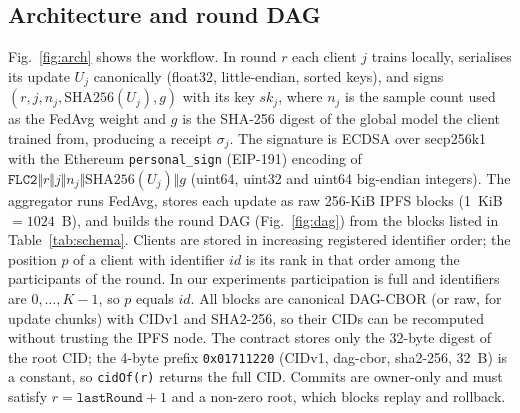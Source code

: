 \documentclass[final,3p,times,twocolumn]{elsarticle}
\begin{document}
\subsection{Architecture and round DAG}
Fig.~\ref{fig:arch} shows the workflow. In round $r$ each client $j$ trains locally, serialises its update $U_j$ canonically (float32, little-endian, sorted keys), and signs $(r, j, n_j, \mathrm{SHA256}(U_j), g)$ with its key $sk_j$, where $n_j$ is the sample count used as the FedAvg weight and $g$ is the SHA-256 digest of the global model the client trained from, producing a receipt $\sigma_j$. The signature is ECDSA over secp256k1 with the Ethereum \texttt{personal\_sign} (EIP-191) encoding of $\texttt{FLC2}\Vert r\Vert j\Vert n_j\Vert\mathrm{SHA256}(U_j)\Vert g$ (uint64, uint32 and uint64 big-endian integers). The aggregator runs FedAvg, stores each update as raw 256-KiB IPFS blocks (1~KiB $=1024$~B), and builds the round DAG (Fig.~\ref{fig:dag}) from the blocks listed in Table~\ref{tab:schema}. Clients are stored in increasing registered identifier order; the position $p$ of a client with identifier $\mathit{id}$ is its rank in that order among the participants of the round. In our experiments participation is full and identifiers are $0,\ldots,K-1$, so $p$ equals $\mathit{id}$. All blocks are canonical DAG-CBOR (or raw, for update chunks) with CIDv1 and SHA2-256, so their CIDs can be recomputed without trusting the IPFS node. The contract stores only the 32-byte digest of the root CID; the 4-byte prefix \texttt{0x01711220} (CIDv1, dag-cbor, sha2-256, 32~B) is a constant, so \texttt{cidOf(r)} returns the full CID. Commits are owner-only and must satisfy $r=\texttt{lastRound}+1$ and a non-zero root, which blocks replay and rollback.
\end{document}
